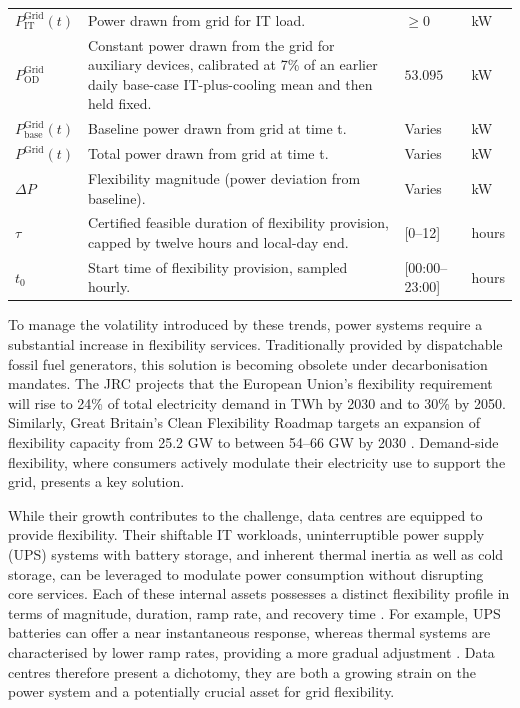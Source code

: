 \documentclass[lettersize,journal]{IEEEtran}
\newcommand{\rev}[1]{#1}
\begin{document}
{{\begin{longtable}{p{} p{} p{} p{}}
$P^{\mathrm{Grid}}_{\mathrm{IT}}(t)$ & Power drawn from grid for IT load. & $\geq 0$ &kW \\
$P^{\mathrm{Grid}}_{\mathrm{OD}}$ & \rev{Constant power drawn from the grid for auxiliary devices, calibrated at 7\% of an earlier daily base-case IT-plus-cooling mean and then held fixed.} & $53.095$ &kW \\
$P^{\mathrm{Grid}}_{\mathrm{base}}(t)$ & Baseline power drawn from grid at time t. & Varies &kW \\
$P^{\mathrm{Grid}}(t)$ & Total power drawn from grid at time t. & Varies &kW \\
$\Delta P$ & Flexibility magnitude (power deviation from baseline). & Varies &kW \\
$\tau$ & Certified feasible duration of flexibility provision, capped by twelve hours and local-day end. & [0--12] & hours \\
$t_0$ & Start time of flexibility provision, sampled hourly. & [00:00--23:00] & hours \\
\end{longtable}
\twocolumn
}
} %
To manage the volatility introduced by these trends, power systems require a substantial increase in flexibility services. Traditionally provided by dispatchable fossil fuel generators, this solution is becoming obsolete under decarbonisation mandates. The JRC \cite{koolen2023flexibility} projects that the European Union’s flexibility requirement will rise to 24\% of total electricity demand in TWh by 2030 and to 30\% by 2050. Similarly, Great Britain’s Clean Flexibility Roadmap targets an expansion of flexibility capacity from 25.2 GW to between 54–66 GW by 2030 \cite{clean_flexibility_roadmap}. Demand-side flexibility, where consumers actively modulate their electricity use to support the grid, presents a key solution.

While their growth contributes to the challenge, data centres are equipped to provide flexibility. Their shiftable IT workloads, uninterruptible power supply (UPS) systems with battery storage, and inherent thermal inertia as well as cold storage, can be leveraged to modulate power consumption without disrupting core services. Each of these internal assets possesses a distinct flexibility profile in terms of magnitude, duration, ramp rate, and recovery time \cite{zhang2025unlocking}. For example, UPS batteries can offer a near instantaneous response, whereas thermal systems are characterised by lower ramp rates, providing a more gradual adjustment \cite{zhang2025unlocking, alapera2018data}. Data centres therefore present a dichotomy, they are both a growing strain on the power system and a potentially crucial asset for grid flexibility.
\end{document}
